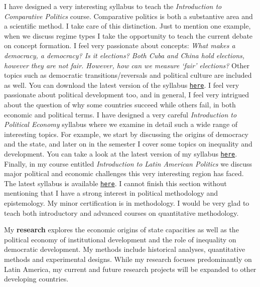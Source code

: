 \documentclass[10pt,stdletter,dateno,sigleft]{newlfm} %
\begin{document}
\begin{newlfm}
I have designed a very interesting syllabus to teach the \emph{Introduction to Comparative Politics} course. Comparative politics is both a substantive area and a scientific method. I take care of this distinction. Just to mention one example, when we discuss regime types I take the opportunity to teach the current debate on concept formation. I feel very passionate about concepts: \emph{What makes a democracy, a democracy? Is it elections? Both Cuba and China hold elections, however they are not fair. However, how can we measure `fair' elections?} Other topics such as democratic transitions/reversals and political culture are included as well. You can download the latest version of the syllabus \href{https://github.com/hbahamonde/Comparative_Politics_UGRAD/raw/master/Bahamonde_Comparative_Politics_Syllabus_UGRAD.pdf}{\texttt{here}}. I feel very passionate about political development too, and in general, I feel very intrigued about the question of why some countries succeed while others fail, in both economic and political terms. I have designed a very careful \emph{Introduction to Political Economy} syllabus where we examine in detail such a wide range of interesting topics. For example, we start by discussing the origins of democracy and the state, and later on in the semester I cover some topics on inequality and development. You can take a look at the latest version of my syllabus \href{https://github.com/hbahamonde/Political-Economy-Intro-UGrad/raw/master/Pol_Econ_Dev_Syllabus_UGRAD.pdf}{\texttt{here}}. Finally, in my course entitled \emph{Introduction to Latin American Politics} we discuss major political and economic challenges this very interesting region has faced. The latest syllabus is available \href{https://github.com/hbahamonde/Latin_American_Politics_UGRAD/raw/master/Bahamonde_Latin_American_Politics_Syllabus_UGRAD.pdf}{\texttt{here}}. I cannot finish this section without mentioning that I have a strong interest in political methodology and epistemology. My minor certification is in methodology. I would be very glad to teach both introductory and advanced courses on quantitative methodology.


My {\bf research} explores the economic origins of state capacities as well as the political economy of institutional development and the role of inequality on democratic development. My methods include historical analyses, quantitative methods and experimental designs. While my research focuses predominantly on Latin America, my current and future research projects will be expanded to other developing countries.


\end{newlfm}
\end{document}
